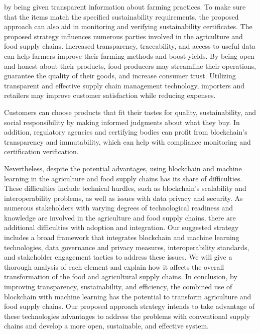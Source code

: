 by being given transparent information about farming practices. To make sure that the items match the specified sustainability 
requirements, the proposed approach can also aid in monitoring and verifying sustainability certificates.
The proposed strategy influences numerous parties involved in the agriculture and food supply chains. Increased transparency, 
traceability, and access to useful data can help farmers improve their farming methods and boost yields. By being open and honest 
about their products, food producers may streamline their operations, guarantee the quality of their goods, and increase consumer 
trust. Utilizing transparent and effective supply chain management technology, importers and retailers may improve customer 
satisfaction while reducing expenses.
\par Customers can choose products that fit their tastes for quality, sustainability, and social responsibility by making informed 
judgments about what they buy. In addition, regulatory agencies and certifying bodies can profit from blockchain's transparency 
and immutability, which can help with compliance monitoring and certification verification.
\par Nevertheless, despite the potential advantages, using blockchain and machine learning in the agriculture and food supply chains has 
its share of difficulties. These difficulties include technical hurdles, such as blockchain's scalability and interoperability problems, 
as well as issues with data privacy and security. As numerous stakeholders with varying degrees of technological readiness and 
knowledge are involved in the agriculture and food supply chains, there are additional difficulties with adoption and integration. 
Our suggested strategy includes a broad framework that integrates blockchain and machine learning technologies, data governance 
and privacy measures, interoperability standards, and stakeholder engagement tactics to address these issues. We will give a 
thorough analysis of each element and explain how it affects the overall transformation of the food and agricultural supply chains.
In conclusion, by improving transparency, sustainability, and efficiency, the combined use of blockchain with machine learning has 
the potential to transform agriculture and food supply chains. Our proposed approach strategy intends to take advantage of these 
technologies advantages to address the problems with conventional supply chains and develop a more open, sustainable, and 
effective system.


